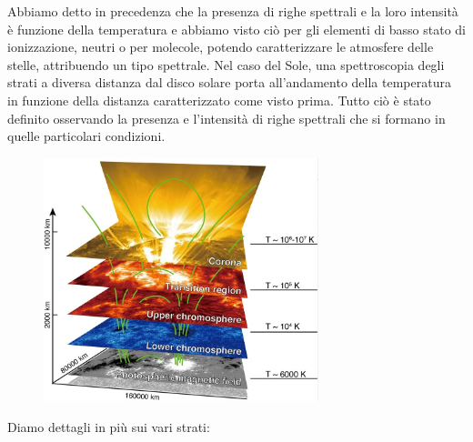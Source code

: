 Abbiamo detto in precedenza che la presenza di righe spettrali e la loro intensità è funzione della temperatura e abbiamo visto ciò per gli elementi di basso stato di ionizzazione, neutri o per molecole, potendo caratterizzare le atmosfere delle stelle, attribuendo un tipo spettrale. Nel caso del Sole, una spettroscopia degli strati a diversa distanza dal disco solare porta all'andamento della temperatura in funzione della distanza caratterizzato come visto prima. Tutto ciò è stato definito osservando la presenza e l'intensità di righe spettrali che si formano in quelle particolari condizioni.

\begin{figure}[H]
    \centering
    \includegraphics[width=8cm]{Struttura interna del Sole.JPG}
\end{figure}

Diamo dettagli in più sui vari strati:

